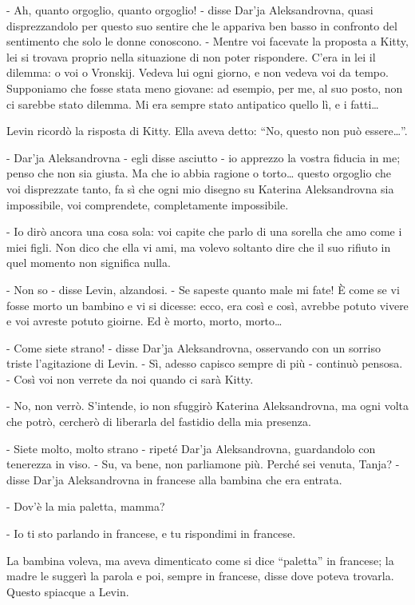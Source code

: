 - Ah, quanto orgoglio, quanto orgoglio! - disse Dar'ja Aleksandrovna, quasi disprezzandolo per questo suo sentire che le appariva ben basso in confronto del sentimento che solo le donne conoscono. - Mentre voi facevate la proposta a Kitty, lei si trovava proprio nella situazione di non poter rispondere. C'era in lei il dilemma: o voi o Vronskij. Vedeva lui ogni giorno, e non vedeva voi da tempo. Supponiamo che fosse stata meno giovane: ad esempio, per me, al suo posto, non ci sarebbe stato dilemma. Mi era sempre stato antipatico quello lì, e i fatti\ldots{} 

Levin ricordò la risposta di Kitty. Ella aveva detto: ``No, questo non può essere\ldots{}''. 

- Dar'ja Aleksandrovna - egli disse asciutto - io apprezzo la vostra fiducia in me; penso che non sia giusta. Ma che io abbia ragione o torto\ldots{} questo orgoglio che voi disprezzate tanto, fa sì che ogni mio disegno su Katerina Aleksandrovna sia impossibile, voi comprendete, completamente impossibile. 

- Io dirò ancora una cosa sola: voi capite che parlo di una sorella che amo come i miei figli. Non dico che ella vi ami, ma volevo soltanto dire che il suo rifiuto in quel momento non significa nulla. 

- Non so - disse Levin, alzandosi. - Se sapeste quanto male mi fate! È come se vi fosse morto un bambino e vi si dicesse: ecco, era così e così, avrebbe potuto vivere e voi avreste potuto gioirne. Ed è morto, morto, morto\ldots{} 

- Come siete strano! - disse Dar'ja Aleksandrovna, osservando con un sorriso triste l'agitazione di Levin. - Sì, adesso capisco sempre di più - continuò pensosa. - Così voi non verrete da noi quando ci sarà Kitty. 

- No, non verrò. S'intende, io non sfuggirò Katerina Aleksandrovna, ma ogni volta che potrò, cercherò di liberarla del fastidio della mia presenza. 

- Siete molto, molto strano - ripeté Dar'ja Aleksandrovna, guardandolo con tenerezza in viso. - Su, va bene, non parliamone più. Perché sei venuta, Tanja? - disse Dar'ja Aleksandrovna in francese alla bambina che era entrata. 

- Dov'è la mia paletta, mamma? 

- Io ti sto parlando in francese, e tu rispondimi in francese. 

La bambina voleva, ma aveva dimenticato come si dice ``paletta'' in francese; la madre le suggerì la parola e poi, sempre in francese, disse dove poteva trovarla. Questo spiacque a Levin. 


